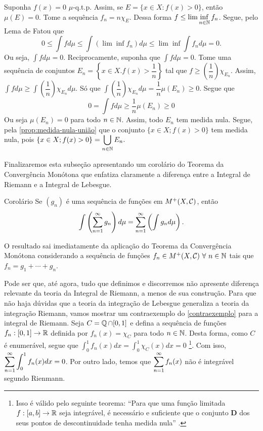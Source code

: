\begin{prova}
	Suponha $f(x) = 0$ $\mu$-q.t.p.
	Assim, se $E = \{ x \in X: f(x) > 0\}$, então $\mu(E) = 0$.
	Tome a sequência $f_n = n\chi_E$.
	Dessa forma $\displaystyle f \leq \lim \inf_{n \in \operatorname{\mathbb{N}}} f_n$.
	Segue, pelo Lema de Fatou que
	$$
	0 
	\leq
	\int f d\mu
	\leq
	\int (\lim \inf f_n) d\mu
	\leq
	\lim \inf \int f_n d\mu
	=
	0.
	$$
	Ou seja, $\displaystyle\int f d\mu = 0$.
	Reciprocamente, suponha que $\displaystyle\int f d\mu = 0$.
	Tome uma sequência de conjuntos 
	$E_n = \left\{ x \in X. f(x) > \dfrac{1}{n}\right\}$ tal que 
	$f \geq \left(\dfrac{1}{n}\right)\chi_{E_n}$.
	Assim, $\int f d\mu \geq \int \left(\dfrac{1}{n}\right)\chi_{E_n} d\mu$.
	Só que 
	$\int \left(\dfrac{1}{n}\right)\chi_{E_n} d\mu
	= \dfrac{1}{n}\mu(E_n) \geq 0.
	$
	Segue que
	$$
	0 = \int f d\mu 
	\geq 
	\dfrac{1}{n}\mu(E_n) \geq 0
	$$
	Ou seja $\mu(E_n) = 0$ para todo $n \in \operatorname{\mathbb{N}}$.
	Assim, todo $E_n$ tem medida nula.
	Segue, pela \ref{prop:medida-nula-união}
	que o conjunto $\{x \in X; f(x) > 0\}$ tem medida nula, pois
	$\{x \in X; f(x) > 0\}
	=
	\displaystyle
	\bigcup_{n \in \operatorname{\mathbb{N}}} E_n.
	$
	
\end{prova}
Finalizaremos esta subseção apresentando um corolário do Teorema da Convergência Monótona que enfatiza claramente a diferença entre a Integral de Riemann e a Integral de Lebesgue.

\begin{env}{Corolário}
	\label{contraexemplo}
	Se $(g_n)$ é uma sequência de funções em $M^+(X, \operatorname{\mathcal{C}})$, então 
	$$
	\int \left(\displaystyle \sum_{n = 1} ^\infty g_n\right)d\mu
	=
	\displaystyle \sum_{n = 1} ^\infty \left(\int g_n d\mu\right).
	$$
\end{env}
\begin{prova}
	O resultado sai imediatamente da aplicação do Teorema da Convergência Monótona considerando a sequência de funções $f_n \in M^+(X, \operatorname{\mathcal{C}})\ \forall\  n \in \operatorname{\mathbb{N}}$ tais que
	$f_n = g_1 + \cdots + g_n  $.
\end{prova}

Pode ser que, até agora, tudo que definimos e discorremos não apresente diferença relevante da teoria da Integral de Riemann, a menos de sua construção.
Para que não haja dúvidas que a teoria da integração de Lebesgue generaliza a teoria da integração Riemann, vamos mostrar um contraexemplo do \ref{contraexemplo} para a integral de Riemann. 
Seja $C = \operatorname{\mathbb{Q}} \cap [0,1]$ e defina a sequência de funções $f_n: [0,1] \to \mathbb{R}$ definida por $f_n(x) = \chi_C$ para todo $n \in \operatorname{\mathbb{N}}$.
Desta forma, como $C$ é enumerável, segue que $\displaystyle \int_{0}^{1} f_n(x)dx = \int_{0}^{1} \chi_C(x) dx = 0$
\footnote{Isso é válido pelo seguinte teorema:
	\enquote{Para que uma função limitada $f : [a, b] \to \mathbb{R}$ seja
		integrável, é necessário e suficiente que o conjunto \textbf{D} dos seus
		pontos de descontinuidade tenha medida nula} \cite[p.344]{elon}.
}.
Com isso, $\displaystyle \sum_{n = 1}^\infty \int_{0}^{1} f_n(x)dx = 0$.
Por outro lado, temos que
$
\displaystyle \sum_{n = 1}^\infty f_n(x)
$
não é integrável segundo Rienmann.
